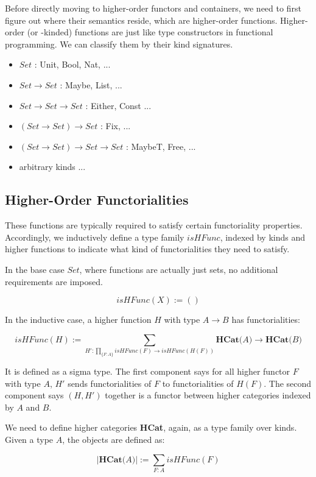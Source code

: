 Before directly moving to higher-order functors and containers, we need to first figure out where their semantics reside, which are higher-order functions. Higher-order (or -kinded) functions are just like type constructors in functional programming. We can classify them by their kind signatures.

\begin{itemize}
  \item{$Set$ : Unit, Bool, Nat, ...} 
  \item{$Set \to Set$ : Maybe, List, ...}
  \item{$Set \to Set \to Set$ : Either, Const ...}
  \item{$(Set \to Set) \to Set$ : Fix, ...}
  \item{$(Set \to Set) \to Set \to Set$ : MaybeT, Free, ...}
  \item{arbitrary kinds ...}
\end{itemize}

\subsection{Higher-Order Functorialities}

These functions are typically required to satisfy certain functoriality properties. Accordingly, we inductively define a type family $isHFunc$, indexed by kinds and higher functions to indicate what kind of functorialities they need to satisfy.

In the base case $Set$, where functions are actually just sets, no additional requirements are imposed.

\[ isHFunc(X) := () \]

In the inductive case, a higher function $H$ with type $A \to B$ has functorialities:

\[ isHFunc(H) := \sum_{H' : \prod_{\{F : A\}} isHFunc(F) \to isHFunc(H(F))} \textbf{HCat(} A \textbf{)} \to \textbf{HCat(} B \textbf{)} \]

It is defined as a sigma type. The first component says for all higher functor $F$ with type $A$, $H'$ sends functorialities of $F$ to functorialities of $H(F)$. The second component says $(H , H')$ together is a functor between higher categories indexed by $A$ and $B$.

We need to define higher categories \textbf{HCat}, again, as a type family over kinds. Given a type $A$, the objects are defined as:

\[ \lvert\textbf{HCat(} A \textbf{)}\rvert := \sum_{F : A} isHFunc(F) \]

